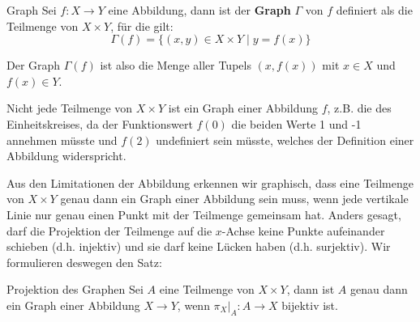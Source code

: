\begin{definition}{Graph}{}
Sei $f: X \to Y$ eine Abbildung, dann ist der \textbf{Graph} $\Gamma$ von $f$ definiert als die Teilmenge von $X \times Y$, für die gilt:
$$\Gamma(f) = \{(x,y) \in X \times Y\mid y = f(x) \}$$
\end{definition}
Der Graph $\Gamma(f)$ ist also die Menge aller Tupels $(x, f(x))$ mit $x \in X$ und $f(x) \in Y$.
\begin{remark}
Nicht jede Teilmenge von $X\times Y$ ist ein Graph einer Abbildung $f$, z.B. die des Einheitskreises, da der Funktionswert $f(0)$ die beiden Werte 1 und -1 annehmen müsste und $f(2)$ undefiniert sein müsste, welches der Definition einer Abbildung widerspricht.
\end{remark}
Aus den Limitationen der Abbildung erkennen wir graphisch, dass eine Teilmenge von $X \times Y$ genau dann ein Graph einer Abbildung sein muss, wenn jede vertikale Linie nur genau einen Punkt mit der Teilmenge gemeinsam hat. Anders gesagt, darf die Projektion der Teilmenge auf die $x$-Achse keine Punkte aufeinander schieben (d.h. injektiv) und sie darf keine Lücken haben (d.h. surjektiv). Wir formulieren deswegen den Satz:

\begin{satz}{Projektion des Graphen}{}
Sei $A$ eine Teilmenge von $X \times Y$, dann ist $A$ genau dann ein Graph einer Abbildung $X \to Y$, wenn $\pi_X\big|_A: A \to X$ bijektiv ist.
\end{satz}

